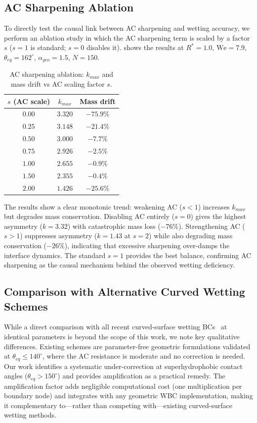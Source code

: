 \subsection{AC Sharpening Ablation}

To directly test the causal link between AC sharpening and wetting accuracy, we perform an ablation study in which the AC sharpening term is scaled by a factor $s$ ($s=1$ is standard; $s=0$ disables it).  shows the results at $R^*=1.0$, $\mathrm{We}=7.9$, $\theta_{eq}=162^\circ$, $\alpha_{geo}=1.5$, $N=150$.

\begin{table}[htbp]
\centering
\caption{AC sharpening ablation: $k_{max}$ and mass drift vs AC scaling factor $s$.}
\label{tab:ac_ablation}
\begin{tabular}{c|c|c}
\hline
$s$ (AC scale) & $k_{max}$ & Mass drift \\
\hline
$0.00$ & $3.320$ & $-75.9\%$ \\
$0.25$ & $3.148$ & $-21.4\%$ \\
$0.50$ & $3.000$ & $-7.7\%$ \\
$0.75$ & $2.926$ & $-2.5\%$ \\
$1.00$ & $2.655$ & $-0.9\%$ \\
$1.50$ & $2.355$ & $-0.4\%$ \\
$2.00$ & $1.426$ & $-25.6\%$ \\
\hline
\end{tabular}
\end{table}

The results show a clear monotonic trend: weakening AC ($s < 1$) increases $k_{max}$ but degrades mass conservation. Disabling AC entirely ($s=0$) gives the highest asymmetry ($k=3.32$) with catastrophic mass loss ($-76\%$). Strengthening AC ($s > 1$) suppresses asymmetry ($k=1.43$ at $s=2$) while also degrading mass conservation ($-26\%$), indicating that excessive sharpening over-damps the interface dynamics. The standard $s=1$ provides the best balance, confirming AC sharpening as the causal mechanism behind the observed wetting deficiency.

\subsection{Comparison with Alternative Curved Wetting Schemes}

While a direct comparison with all recent curved-surface wetting BCs~\cite{huang2022simplified,zhang2022wetting,huang2023simplified,wang2024wetting} at identical parameters is beyond the scope of this work, we note key qualitative differences. Existing schemes are parameter-free geometric formulations validated at $\theta_{eq} \leq 140^\circ$, where the AC resistance is moderate and no correction is needed. Our work identifies a systematic under-correction at superhydrophobic contact angles ($\theta_{eq} > 150^\circ$) and provides amplification as a practical remedy. The amplification factor adds negligible computational cost (one multiplication per boundary node) and integrates with any geometric WBC implementation, making it complementary to---rather than competing with---existing curved-surface wetting methods.
